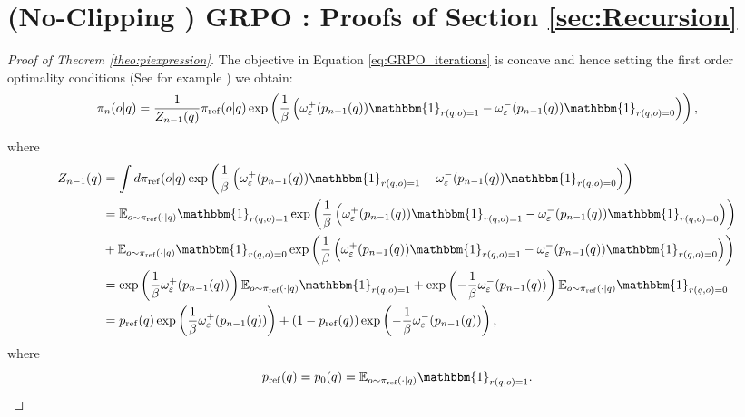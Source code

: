 \documentclass[11pt,reqno]{amsart}
\begin{document}
\newpage
\newpage


\section{(No-Clipping ) GRPO : Proofs of Section \ref{sec:Recursion}}




\begin{proof} [Proof of Theorem \ref{theo:piexpression}] 

The objective in  Equation \eqref{eq:GRPO_iterations} is concave and hence setting the first order optimality conditions (See for example \citep{mroueh2024informationtheoreticguaranteespolicy} ) we obtain:
\[ \pi_{n}(o|q)  = \frac{1}{Z_{n-1}(q)}\pi_{\mathrm{ref}}(o|q) \exp \left(\frac{1}{\beta} \left( \omega^+_{\varepsilon}(p_{n-1}(q)) \mathbbm{1}_{r(q,o)=1}  - \omega^-_{\varepsilon}(p_{n-1}(q))   \mathbbm{1}_{r(q,o)=0} \right) \right),  \]

where 
\begin{align*}
Z_{n-1}(q) &= \int d\pi_{\mathrm{ref}}(o|q) \exp \left(\frac{1}{\beta} \left( \omega^+_{\varepsilon}(p_{n-1}(q)) \mathbbm{1}_{r(q,o)=1}  - \omega^-_{\varepsilon}(p_{n-1}(q))   \mathbbm{1}_{r(q,o)=0} \right) \right) \\
& = \mathbb{E}_{o \sim \pi_{\mathrm{ref}}(\cdot| q) } \mathbbm{1}_{r(q,o)=1} \exp \left(\frac{1}{\beta} \left( \omega^+_{\varepsilon}(p_{n-1}(q)) \mathbbm{1}_{r(q,o)=1}  - \omega^-_{\varepsilon}(p_{n-1}(q))   \mathbbm{1}_{r(q,o)=0} \right) \right)\\
& + \mathbb{E}_{o \sim \pi_{\mathrm{ref}}(\cdot| q) } \mathbbm{1}_{r(q,o)=0}  \exp \left(\frac{1}{\beta} \left( \omega^+_{\varepsilon}(p_{n-1}(q)) \mathbbm{1}_{r(q,o)=1}  - \omega^-_{\varepsilon}(p_{n-1}(q))   \mathbbm{1}_{r(q,o)=0} \right) \right)\\
& =\exp \left(\frac{1}{\beta} \omega^+_{\varepsilon}(p_{n-1}(q))\right)  \mathbb{E}_{o \sim \pi_{\mathrm{ref}}(\cdot| q) } \mathbbm{1}_{r(q,o)=1} + \exp \left(-\frac{1}{\beta} \omega^-_{\varepsilon}(p_{n-1}(q))\right) \mathbb{E}_{o \sim \pi_{\mathrm{ref}}(\cdot| q) } \mathbbm{1}_{r(q,o)=0} \\
& = p_{\mathrm{ref}}(q)\exp \left(\frac{1}{\beta} \omega^+_{\varepsilon}(p_{n-1}(q))\right) + (1-p_{\mathrm{ref}}(q ))  \exp \left(-\frac{1}{\beta} \omega^-_{\varepsilon}(p_{n-1}(q))\right) ,
\end{align*}
where $$ p_{\mathrm{ref}}(q) =p_0(q) =\mathbb{E}_{o \sim \pi_{\mathrm{ref}} (\cdot | q) } \mathbbm{1}_{r(q,o)=1}.$$

\end{proof}
\end{document}
